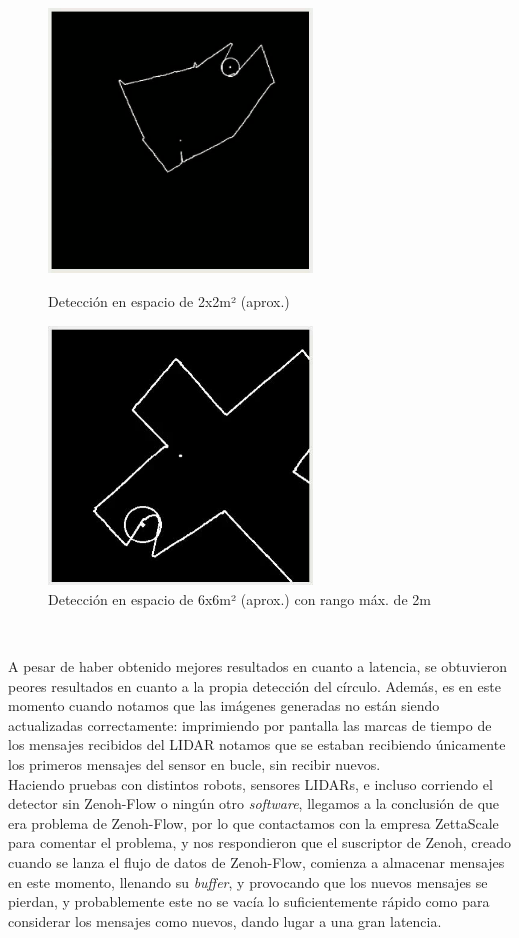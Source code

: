 \begin{figure}[h!]
  \centering
  \begin{minipage}{0.45\textwidth}
    \centering
    \includegraphics[width=7cm]{figs/lab_2x2}
    \caption{Detección en espacio de 2x2m² (aprox.)}
    \label{fig:lab_2x2}
  \end{minipage}
  \hfill
  \begin{minipage}{0.45\textwidth}
    \centering
    \includegraphics[width=7cm]{figs/lab_6x6_max2m}
    \caption{Detección en espacio de 6x6m² (aprox.) con rango máx. de 2m}
    \label{fig:lab_6x6}
  \end{minipage}
\end{figure}\

A pesar de haber obtenido mejores resultados en cuanto a latencia, se obtuvieron
peores resultados en cuanto a la propia detección del círculo.
Además, es en este momento cuando notamos que las imágenes generadas no están
siendo actualizadas correctamente: imprimiendo por pantalla las marcas de
tiempo de los mensajes recibidos del LIDAR notamos que se estaban recibiendo
únicamente los primeros mensajes del sensor en bucle, sin recibir nuevos.
\\

Haciendo pruebas con distintos robots, sensores LIDARs, e incluso corriendo el
detector sin Zenoh-Flow o ningún otro \textit{software}, llegamos a la
conclusión de que era problema de Zenoh-Flow, por lo que contactamos con la
empresa ZettaScale para comentar el problema, y nos respondieron que el
suscriptor de Zenoh, creado cuando se lanza el flujo de datos de Zenoh-Flow,
comienza a almacenar mensajes en este momento, llenando su \textit{buffer}, y
provocando que los nuevos mensajes se pierdan, y probablemente este no se vacía
lo suficientemente rápido como para considerar los mensajes como nuevos, dando
lugar a una gran latencia.
\\



